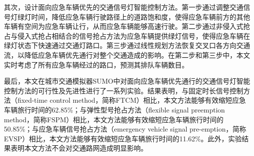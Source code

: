 其次，设计面向应急车辆优先的交通信号灯智能控制方法。第一步通过调整交通信号灯绿灯时间，降低应急车辆行驶路径上的道路饱和度，使得应急车辆前方的其他车辆有空间为应急车辆让行，从而应急车辆能够高速行驶。第二步通过非侵入式抢占与侵入式抢占相结合的信号抢占方法为应急车辆提供绿灯信号，使得应急车辆在绿灯状态下快速通过交通灯路口。第三步通过线性规划方法恢复交叉口各方向交通流，以降低应急车辆优先通行对整个交通造成的影响。在第二步和第三步中，本文实时考虑了所有应急车辆经过的路口，预测其排队车辆数目。

最后，本文在城市交通模拟器SUMO中对面向应急车辆优先通行的交通信号灯智能控制方法的可行性及先进性进行了一系列实验。结果表明，与固定时长信号控制方法（fixed-time control method，简称FTCM）相比，本文方法能够有效缩短应急车辆旅行时间的62.85\%；与弹性型号抢占方法（flexible signal preemption  method，简称FSPM）相比，本文方法能够有效缩短应急车辆旅行时间的50.85\%；与应急车辆信号抢占方法（emergency vehicle signal pre-emption，简称EVSP）相比，本文方法能够有效缩短应急车辆旅行时间的11.62\%。此外，实验结果表明本文方法不会对交通路网造成明显影响。


\hspace{-0.5cm}
